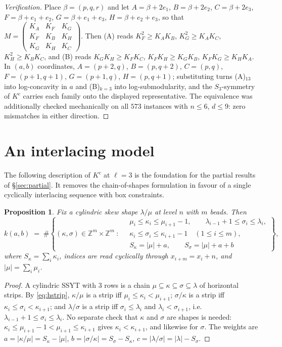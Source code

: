 \documentclass[11pt]{article}
\theoremstyle{plain}
\newtheorem{proposition}[theorem]{Proposition}
\theoremstyle{definition}
\newcommand{\ZZ}{\mathbb{Z}}
\begin{document}
\begin{proof}[Verification]
Place $\beta=(p,q,r)$ and let $A=\beta+2e_1$, $B=\beta+2e_2$, $C=\beta+2e_3$, $F=\beta+e_1+e_2$,
$G=\beta+e_1+e_3$, $H=\beta+e_2+e_3$, so that
$M=\left(\begin{smallmatrix}K_A&K_F&K_G\\K_F&K_B&K_H\\K_G&K_H&K_C\end{smallmatrix}\right)$.
Then (A) reads $K_F^2\ge K_AK_B$, $K_G^2\ge K_AK_C$, $K_H^2\ge K_BK_C$, and (B) reads
$K_GK_H\ge K_FK_C$, $K_FK_H\ge K_GK_B$, $K_FK_G\ge K_HK_A$. In $(a,b)$ coordinates,
$A=(p+2,q)$, $B=(p,q+2)$, $C=(p,q)$, $F=(p+1,q+1)$, $G=(p+1,q)$, $H=(p,q+1)$; substituting turns
(A)$_{13}$ into log-concavity in $a$ and (B)$_{k=3}$ into log-submodularity, and the $S_3$-symmetry
of $K^c$ carries each family onto the displayed representative. The equivalence was additionally
checked mechanically on all $573$ instances with $n\le6$, $d\le9$: zero mismatches in either
direction.
\end{proof}

\section{An interlacing model}

The following description of $K^c$ at $\ell=3$ is the foundation for the partial results of
\S\ref{sec:partial}. It removes the chain-of-shapes formulation in favour of a single cyclically
interlacing sequence with box constraints.

\begin{proposition}\label{prop:model}
Fix a cylindric skew shape $\lambda/\mu$ at level $n$ with $m$ beads. Then
\[
k(a,b)\;=\;\#\left\{(\kappa,\sigma)\in\ZZ^m\times\ZZ^m\ :\
\begin{aligned}
&\mu_i\le\kappa_i\le\mu_{i+1}-1,\qquad \lambda_{i-1}+1\le\sigma_i\le\lambda_i,\\
&\kappa_i\le\sigma_i\le\kappa_{i+1}-1\quad (1\le i\le m),\\
&S_\kappa=|\mu|+a,\qquad S_\sigma=|\mu|+a+b
\end{aligned}
\right\},
\]
where $S_\kappa=\sum_i\kappa_i$, indices are read cyclically through $x_{i+m}=x_i+n$, and
$|\mu|=\sum_i\mu_i$.
\end{proposition}

\begin{proof}
A cylindric SSYT with $3$ rows is a chain $\mu\subseteq\kappa\subseteq\sigma\subseteq\lambda$ of
horizontal strips. By \eqref{eq:hstrip}, $\kappa/\mu$ is a strip iff $\mu_i\le\kappa_i<\mu_{i+1}$;
$\sigma/\kappa$ is a strip iff $\kappa_i\le\sigma_i<\kappa_{i+1}$; and $\lambda/\sigma$ is a strip
iff $\sigma_i\le\lambda_i$ and $\lambda_i<\sigma_{i+1}$, i.e.\ $\lambda_{i-1}+1\le\sigma_i\le\lambda_i$.
No separate check that $\kappa$ and $\sigma$ are shapes is needed: $\kappa_i\le\mu_{i+1}-1<\mu_{i+1}\le\kappa_{i+1}$
gives $\kappa_i<\kappa_{i+1}$, and likewise for $\sigma$. The weights are
$a=|\kappa/\mu|=S_\kappa-|\mu|$, $b=|\sigma/\kappa|=S_\sigma-S_\kappa$, $c=|\lambda/\sigma|=|\lambda|-S_\sigma$.
\end{proof}
\end{document}
